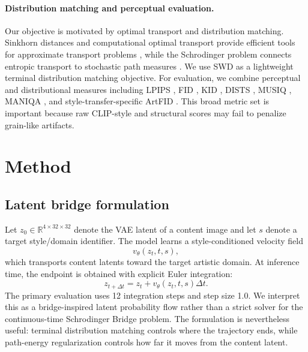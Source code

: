 \documentclass{article}
\begin{document}
\paragraph{Distribution matching and perceptual evaluation.}
Our objective is motivated by optimal transport and distribution matching. Sinkhorn distances and computational optimal transport provide efficient tools for approximate transport problems \cite{cuturi2013sinkhorn,peyre2019computational}, while the Schrodinger problem connects entropic transport to stochastic path measures \cite{leonard2014survey}. We use SWD as a lightweight terminal distribution matching objective. For evaluation, we combine perceptual and distributional measures including LPIPS \cite{zhang2018lpips}, FID \cite{heusel2017fid}, KID \cite{binkowski2018kid}, DISTS \cite{ding2020dists}, MUSIQ \cite{ke2021musiq}, MANIQA \cite{yang2022maniqa}, and style-transfer-specific ArtFID \cite{wright2022artfid}. This broad metric set is important because raw CLIP-style and structural scores may fail to penalize grain-like artifacts.

\section{Method}
\subsection{Latent bridge formulation}
Let $z_0 \in \mathbb{R}^{4 \times 32 \times 32}$ denote the VAE latent of a content image and let $s$ denote a target style/domain identifier. The model learns a style-conditioned velocity field
\begin{equation}
    v_\theta(z_t,t,s),
\end{equation}
which transports content latents toward the target artistic domain. At inference time, the endpoint is obtained with explicit Euler integration:
\begin{equation}
    z_{t+\Delta t} = z_t + v_\theta(z_t,t,s)\Delta t .
\end{equation}
The primary evaluation uses 12 integration steps and step size 1.0. We interpret this as a bridge-inspired latent probability flow rather than a strict solver for the continuous-time Schrodinger Bridge problem. The formulation is nevertheless useful: terminal distribution matching controls where the trajectory ends, while path-energy regularization controls how far it moves from the content latent.
\end{document}
